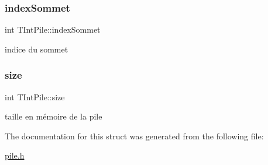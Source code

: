 \subsubsection{\texorpdfstring{index\+Sommet}{indexSommet}}
{\footnotesize\ttfamily int T\+Int\+Pile\+::index\+Sommet}

indice du sommet \mbox{\label{structTIntPile_a69b5112feaa16a029b4a86ec1130dec2}} 
\subsubsection{\texorpdfstring{size}{size}}
{\footnotesize\ttfamily int T\+Int\+Pile\+::size}

taille en mémoire de la pile 

The documentation for this struct was generated from the following file\+:\begin{DoxyCompactItemize}
\item 
\hyperlink{pile_8h}{pile.\+h}\end{DoxyCompactItemize}
